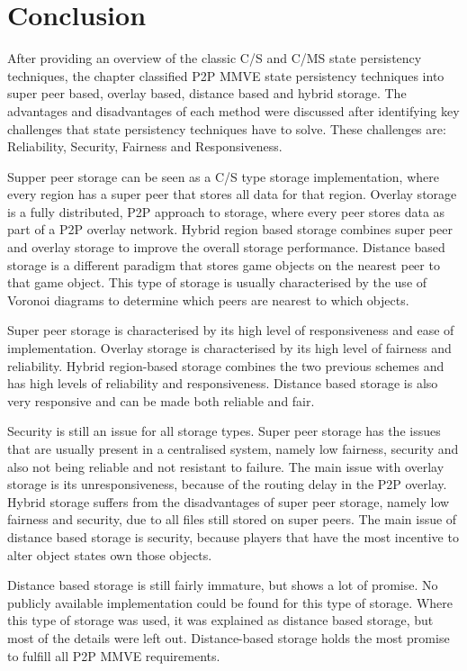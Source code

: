 \section{Conclusion}

After providing an overview of the classic C/S and C/MS state persistency techniques, the chapter classified P2P MMVE state persistency techniques into super peer based, overlay based, distance based and hybrid storage. The advantages and disadvantages of each method were discussed after identifying key challenges that state persistency techniques have to solve. These challenges are: Reliability, Security, Fairness and Responsiveness.

Supper peer storage can be seen as a C/S type storage implementation, where every region has a super peer that stores all data for that region. Overlay storage is a fully distributed, P2P approach to storage, where every peer stores data as part of a P2P overlay network. Hybrid region based storage combines super peer and overlay storage to improve the overall storage performance. Distance based storage is a different paradigm that stores game objects on the nearest peer to that game object. This type of storage is usually characterised by the use of Voronoi diagrams to
determine which peers are nearest to which objects.

Super peer storage is characterised by its high level of responsiveness and ease of implementation. Overlay storage is characterised by its high level of fairness and reliability. Hybrid region-based storage combines the two previous schemes and has high levels of reliability and responsiveness. Distance based storage is also very responsive and can be made both reliable and fair.

Security is still an issue for all storage types. Super peer storage has the issues that are usually present in a centralised system, namely low fairness, security and also not being reliable and not resistant to failure. The main issue with overlay storage is its unresponsiveness, because of the routing delay in the P2P overlay. Hybrid storage suffers from the disadvantages of super peer storage, namely low fairness and security, due to all files still stored on super peers. The main issue of distance based storage is security, because players that have the most incentive to alter object states own those objects.

Distance based storage is still fairly immature, but shows a lot of promise. No publicly available implementation could be found for this type of storage. Where this type of storage was used, it was explained as distance based storage, but most of the details were left out. Distance-based storage holds the most promise to fulfill all P2P MMVE requirements.

